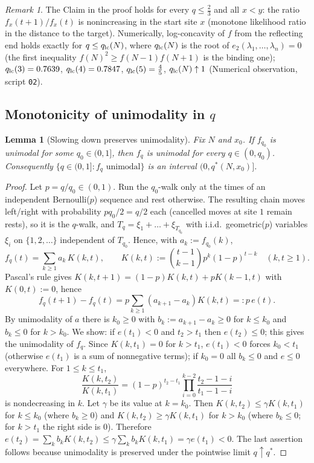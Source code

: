 \documentclass[11pt,a4paper]{article}
\newtheorem{lemma}[theorem]{Lemma}
\theoremstyle{definition}
\theoremstyle{remark}
\newtheorem{remark}[theorem]{Remark}
\begin{document}
\begin{remark}\label{rem:mlr}
The Claim in the proof holds for every $q\le\frac23$ and all $x<y$: the ratio $f_x(t+1)/f_x(t)$ is
nonincreasing in the start site $x$ (monotone likelihood ratio in the distance to the target). Numerically,
log-concavity of $f$ from the reflecting end holds exactly for $q\le q_{\rm lc}(N)$, where $q_{\rm lc}(N)$ is
the root of $e_2(\lambda_1,\dots,\lambda_n)=0$ (the first inequality $f(N)^2\ge f(N-1)f(N+1)$ is the binding
one); $q_{\rm lc}(3)=0.7639$, $q_{\rm lc}(4)=0.7847$, $q_{\rm lc}(5)=\frac45$, $q_{\rm lc}(N)\uparrow1$
(Numerical observation, script \texttt{02}).
\end{remark}

\subsection{Monotonicity of unimodality in \texorpdfstring{$q$}{q}}

\begin{lemma}[Slowing down preserves unimodality]\label{lem:qmono}
Fix $N$ and $x_0$. If $f_{q_0}$ is unimodal for some $q_0\in(0,1]$, then $f_q$ is unimodal for every
$q\in(0,q_0)$. Consequently $\{q\in(0,1]: f_q\text{ unimodal}\}$ is an interval $(0,q^*(N,x_0)]$.
\end{lemma}
\begin{proof}
Let $p=q/q_0\in(0,1)$. Run the $q_0$-walk only at the times of an independent Bernoulli($p$) sequence and rest
otherwise. The resulting chain moves left/right with probability $pq_0/2=q/2$ each (cancelled moves at site $1$
remain rests), so it is the $q$-walk, and $T_q=\xi_1+\dots+\xi_{T_{q_0}}$ with i.i.d.\ geometric($p$) variables
$\xi_i$ on $\{1,2,\dots\}$ independent of $T_{q_0}$. Hence, with $a_k:=f_{q_0}(k)$,
\[
  f_q(t)=\sum_{k\ge1}a_k\,K(k,t),\qquad K(k,t):=\binom{t-1}{k-1}p^k(1-p)^{t-k}\quad(k,t\ge1).
\]
Pascal's rule gives $K(k,t+1)=(1-p)K(k,t)+pK(k-1,t)$ with $K(0,t):=0$, hence
\[
  f_q(t+1)-f_q(t)=p\sum_{k\ge1}(a_{k+1}-a_k)K(k,t)=:p\,e(t).
\]
By unimodality of $a$ there is $k_0\ge0$ with $b_k:=a_{k+1}-a_k\ge0$ for $k\le k_0$ and $b_k\le0$ for $k>k_0$.
We show: if $e(t_1)<0$ and $t_2>t_1$ then $e(t_2)\le0$; this gives the unimodality of $f_q$. Since
$K(k,t_1)=0$ for $k>t_1$, $e(t_1)<0$ forces $k_0<t_1$ (otherwise $e(t_1)$ is a sum of nonnegative terms);
if $k_0=0$ all $b_k\le0$ and $e\le0$ everywhere. For $1\le k\le t_1$,
\[
  \frac{K(k,t_2)}{K(k,t_1)}=(1-p)^{t_2-t_1}\prod_{i=0}^{k-2}\frac{t_2-1-i}{t_1-1-i}
\]
is nondecreasing in $k$. Let $\gamma$ be its value at $k=k_0$. Then $K(k,t_2)\le\gamma K(k,t_1)$ for $k\le k_0$
(where $b_k\ge0$) and $K(k,t_2)\ge\gamma K(k,t_1)$ for $k>k_0$ (where $b_k\le0$; for $k>t_1$ the right side
is $0$). Therefore $e(t_2)=\sum_kb_kK(k,t_2)\le\gamma\sum_kb_kK(k,t_1)=\gamma e(t_1)<0$.
The last assertion follows because unimodality is preserved under the pointwise limit $q\uparrow q^*$.
\end{proof}
\end{document}
